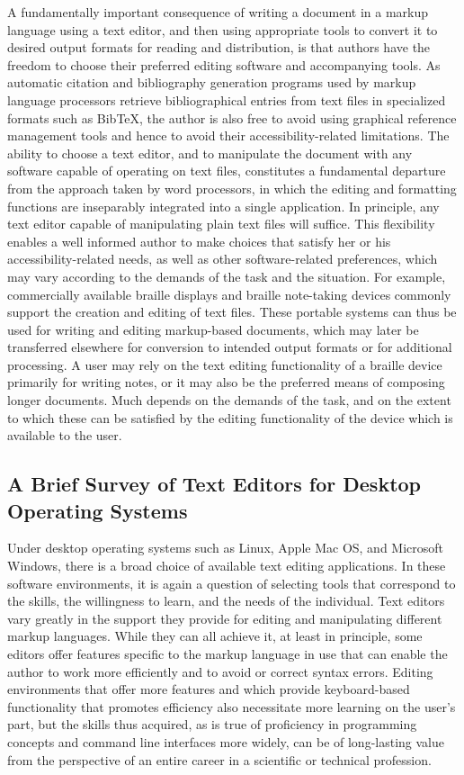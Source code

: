 \documentclass[11pt]{sig-alternate}
\begin{document}
\begin{large}
A fundamentally important consequence of writing a document in a markup language using a text editor, and then using appropriate tools to convert it to desired output formats for reading and distribution, is that authors have the freedom to choose their preferred editing software and accompanying tools. As automatic citation and bibliography generation programs used by markup language processors retrieve bibliographical entries from text files in specialized formats such as BibTeX, the author is also free to avoid using graphical reference management tools and hence to avoid their accessibility-related limitations. The ability to choose a text editor, and to manipulate the document with any software capable of operating on text files, constitutes a fundamental departure from the approach taken by word processors, in which the editing and formatting functions are inseparably integrated into a single application. In principle, any text editor capable of manipulating plain text files will suffice. This flexibility enables a well informed author to make choices that satisfy her or his accessibility-related needs, as well as other software-related preferences, which may vary according to the demands of the task and the situation. For example, commercially available braille displays and braille note-taking devices commonly support the creation and editing of text files. These portable systems can thus be used for writing and editing markup-based documents, which may later be transferred elsewhere for conversion to intended output formats or for additional processing. A user may rely on the text editing functionality of a braille device primarily for writing notes, or it may also be the preferred means of composing longer documents. Much depends on the demands of the task, and on the extent to which these can be satisfied by the editing functionality of the device which is available to the user.

\subsection*{A Brief Survey of Text Editors for Desktop \\Operating Systems}
Under desktop operating systems such as Linux, Apple Mac OS, and Microsoft Windows, there is a broad choice of available text editing applications. In these software environments, it is again a question of selecting tools that correspond to the skills, the willingness to learn, and the needs of the individual. Text editors vary greatly in the support they provide for editing and manipulating different markup languages. While they can all achieve it, at least in principle, some editors offer features specific to the markup language in use that can enable the author to work more efficiently and to avoid or correct syntax errors. Editing environments that offer more features and which provide keyboard-based functionality that promotes efficiency also necessitate more learning on the user’s part, but the skills thus acquired, as is true of proficiency in programming concepts and command line interfaces more widely, can be of long-lasting value from the perspective of an entire career in a scientific or technical profession.


\end{large}
\end{document}
